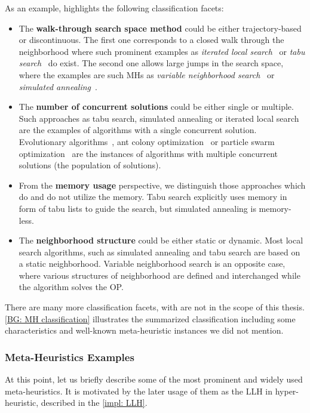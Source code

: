 As an example, \cite{birattari2001classification} highlights the following classification facets:
\begin{itemize}
	\item The \textbf{walk-through search space method} could be either trajectory-based or discontinuous. The first one corresponds to a closed walk through the neighborhood where such prominent examples as \textit{iterated local search}~\cite{lourencco2003iterated} or \textit{tabu search}~\cite{glover1989tabu} do exist. The second one allows large jumps in the search space, where the examples are such MHs as \textit{variable neighborhood search}~\cite{hansen2003variable} or \textit{simulated annealing}~\cite{kirkpatrick1983optimization}.
	
	\item The \textbf{number of concurrent solutions} could be either single or multiple. Such approaches as tabu search, simulated annealing or iterated local search are the examples of algorithms with a single concurrent solution. Evolutionary algorithms~\cite{eiben2015evolutionary}, ant colony optimization~\cite{dorigo2007ant} or particle swarm optimization~\cite{kennedy1995particle} are the instances of algorithms with multiple concurrent solutions (the population of solutions).
	
	\item From the \textbf{memory usage} perspective, we distinguish those approaches which do and do not utilize the memory. Tabu search explicitly uses memory in form of tabu lists to guide the search, but simulated annealing is memory-less.
	
	\item The \textbf{neighborhood structure} could be either static or dynamic. Most local search algorithms, such as simulated annealing and tabu search are based on a static neighborhood. Variable neighborhood search is an opposite case, where various structures of neighborhood are defined and interchanged while the algorithm solves the OP.
\end{itemize}

There are many more classification facets, with are not in the scope of this thesis. \cref{BG: MH classification} illustrates the summarized classification including some characteristics and well-known meta-heuristic instances we did not mention.


\subsubsection{Meta-Heuristics Examples}\label{BG: MH Examples}
At this point, let us briefly describe some of the most prominent and widely used meta-heuristics. It is motivated by the later usage of them as the LLH in hyper-heuristic, described in the \cref{impl: LLH}.

